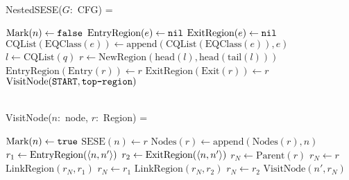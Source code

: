 NestedSESE($G$:~CFG) =
\begin{myalgorithmic}\setlength{\baselineskip}{0.9\baselineskip}
\STATE{}
 \STATE $\text{Mark}(n) \gets \texttt{false}$
\ENDFOR
{}
 \STATE $\text{EntryRegion}(e) \gets \texttt{nil}$
 \STATE $\text{ExitRegion}(e) \gets \texttt{nil}$
\ENDFOR
         \EMPTYLINE
\STATE{}
 \STATE $\text{CQList}\left(\text{EQClass}(e)\right) \gets
	 \text{append}\left(\text{CQList}(\text{EQClass}(e)), e\right)$
\ENDFOR
\STATE{}
 \STATE $l \gets \text{CQList}(q)$
  \STATE $r \gets \text{NewRegion}\left(\text{head}(l),\text{head}(\text{tail}(l))\right)$
  \STATE $\text{EntryRegion}(\text{Entry}(r)) \gets r$
  \STATE $\text{ExitRegion}(\text{Exit}(r)) \gets r$
 \ENDWHILE
\ENDFOR
\STATE{}
\STATE $\text{VisitNode}(\texttt{START}, \texttt{top-region})$
\end{myalgorithmic}
~\\
VisitNode($n$:~node, $r$:~Region) =
\begin{myalgorithmic}\setlength{\baselineskip}{0.9\baselineskip}
 \STATE $\text{Mark}(n) \gets \texttt{true}$
 \STATE{}
 \STATE $\text{SESE}(n) \gets r$
 \STATE $\text{Nodes}(r) \gets \text{append}(\text{Nodes}(r), n)$
         \EMPTYLINE
  \STATE $r_1 \gets \text{EntryRegion}(\left\langle n, n' \right\rangle)$
  \STATE $r_2 \gets \text{ExitRegion}(\left\langle n, n' \right\rangle)$
   \STATE $r_N \gets \text{Parent}(r)$ 
  \ELSE
   \STATE $r_N \gets r$
  \ENDIF
   \STATE $\text{LinkRegion}(r_N, r_1)$ 
   \STATE $r_N \gets r_1$
  \ENDIF
   \STATE $\text{LinkRegion}(r_N, r_2)$ 
   \STATE $r_N \gets r_2$
  \ENDIF
  \STATE $\text{VisitNode}(n', r_N)$
 \ENDFOR
\ENDIF
\end{myalgorithmic}
